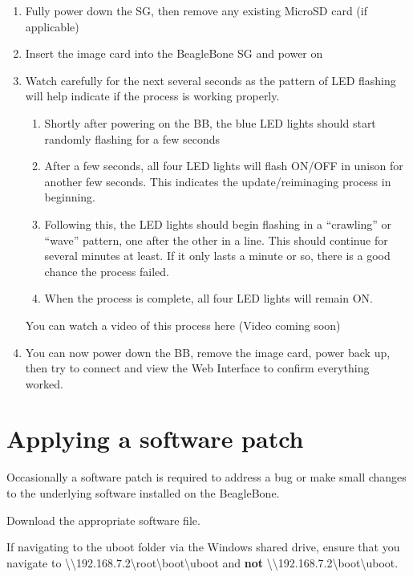 \documentclass[
]{book}
\begin{document}
\begin{enumerate}
\def\labelenumi{\arabic{enumi}.}
\item
  Fully power down the SG, then remove any existing MicroSD card (if applicable)
\item
  Insert the image card into the BeagleBone SG and power on
\item
  Watch carefully for the next several seconds as the pattern of LED flashing will help indicate if the process is working properly.

  \begin{enumerate}
  \def\labelenumii{\roman{enumii})}
  \item
    Shortly after powering on the BB, the blue LED lights should start randomly flashing for a few seconds
  \item
    After a few seconds, all four LED lights will flash ON/OFF in unison for another few seconds. This indicates the update/reiminaging process in beginning.
  \item
    Following this, the LED lights should begin flashing in a ``crawling'' or ``wave'' pattern, one after the other in a line. This should continue for several minutes at least. If it only lasts a minute or so, there is a good chance the process failed.
  \item
    When the process is complete, all four LED lights will remain ON.
  \end{enumerate}

  You can watch a video of this process here (Video coming soon)
\item
  You can now power down the BB, remove the image card, power back up, then try to connect and view the Web Interface to confirm everything worked.
\end{enumerate}

\hypertarget{applying-a-software-patch}{%
\section{Applying a software patch}\label{applying-a-software-patch}}

Occasionally a software patch is required to address a bug or make small changes to the underlying software installed on the BeagleBone.

Download the appropriate software file.

If navigating to the uboot folder via the Windows shared drive, ensure that you navigate to \textbackslash\textbackslash192.168.7.2\textbackslash root\textbackslash boot\textbackslash uboot and \textbf{not} \textbackslash\textbackslash192.168.7.2\textbackslash boot\textbackslash uboot.
\end{document}

